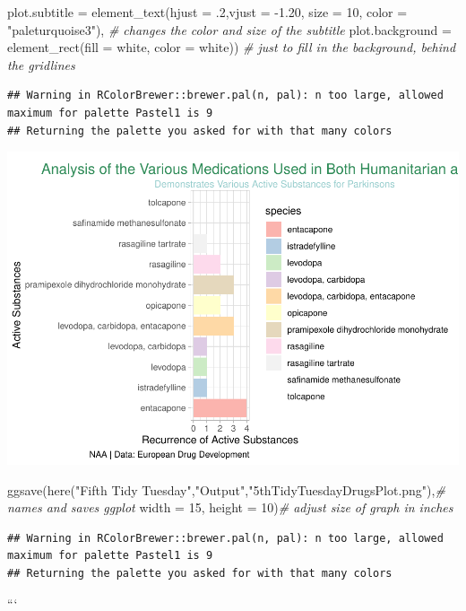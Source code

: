 \documentclass[
]{article}
\newenvironment{Shaded}{\begin{snugshade}}{\end{snugshade}}
\newcommand{\AttributeTok}[1]{\textcolor[rgb]{0.77,0.63,0.00}{#1}}
\newcommand{\CommentTok}[1]{\textcolor[rgb]{0.56,0.35,0.01}{\textit{#1}}}
\newcommand{\DecValTok}[1]{\textcolor[rgb]{0.00,0.00,0.81}{#1}}
\newcommand{\FloatTok}[1]{\textcolor[rgb]{0.00,0.00,0.81}{#1}}
\newcommand{\FunctionTok}[1]{\textcolor[rgb]{0.00,0.00,0.00}{#1}}
\newcommand{\NormalTok}[1]{#1}
\newcommand{\SpecialCharTok}[1]{\textcolor[rgb]{0.00,0.00,0.00}{#1}}
\newcommand{\StringTok}[1]{\textcolor[rgb]{0.31,0.60,0.02}{#1}}
\begin{document}
\begin{Shaded}
\begin{Highlighting}[]
        \AttributeTok{plot.subtitle =} \FunctionTok{element\_text}\NormalTok{(}\AttributeTok{hjust =}\NormalTok{ .}\DecValTok{2}\NormalTok{,}\AttributeTok{vjust =} \SpecialCharTok{{-}}\FloatTok{1.20}\NormalTok{, }\AttributeTok{size =} \DecValTok{10}\NormalTok{, }\AttributeTok{color =} \StringTok{"paleturquoise3"}\NormalTok{), }\CommentTok{\# changes the color and size of the subtitle}
        \AttributeTok{plot.background =} \FunctionTok{element\_rect}\NormalTok{(}\AttributeTok{fill =} \StringTok{\textquotesingle{}white\textquotesingle{}}\NormalTok{, }\AttributeTok{color =} \StringTok{\textquotesingle{}white\textquotesingle{}}\NormalTok{)) }\CommentTok{\# just to fill in the background, behind the gridlines}
\end{Highlighting}
\end{Shaded}

\begin{verbatim}
## Warning in RColorBrewer::brewer.pal(n, pal): n too large, allowed maximum for palette Pastel1 is 9
## Returning the palette you asked for with that many colors
\end{verbatim}

\includegraphics{../Outputs/unnamed-chunk-3-1.pdf}

\begin{Shaded}
\begin{Highlighting}[]
\FunctionTok{ggsave}\NormalTok{(}\FunctionTok{here}\NormalTok{(}\StringTok{"Fifth Tidy Tuesday"}\NormalTok{,}\StringTok{"Output"}\NormalTok{,}\StringTok{"5thTidyTuesdayDrugsPlot.png"}\NormalTok{),}\CommentTok{\# names and saves ggplot}
       \AttributeTok{width =} \DecValTok{15}\NormalTok{, }\AttributeTok{height =} \DecValTok{10}\NormalTok{)}\CommentTok{\# adjust size of graph in inches}
\end{Highlighting}
\end{Shaded}

\begin{verbatim}
## Warning in RColorBrewer::brewer.pal(n, pal): n too large, allowed maximum for palette Pastel1 is 9
## Returning the palette you asked for with that many colors
\end{verbatim}

```
\end{document}
